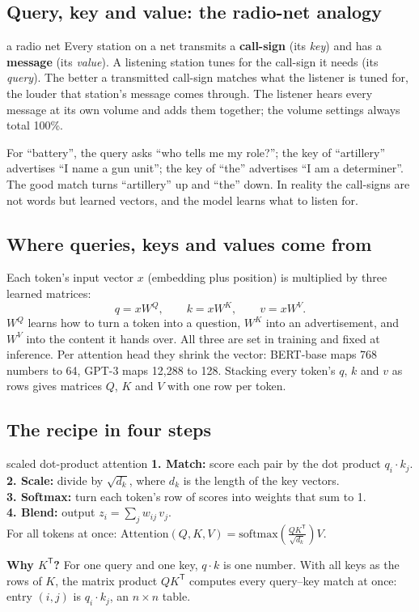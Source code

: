 \documentclass[11pt]{article}
\begin{document}
\subsection{Query, key and value: the radio-net analogy}
\begin{intuition}{a radio net}
Every station on a net transmits a \textbf{call-sign} (its \emph{key}) and has a \textbf{message} (its \emph{value}). A listening station tunes for the call-sign it needs (its \emph{query}). The better a transmitted call-sign matches what the listener is tuned for, the louder that station's message comes through. The listener hears every message at its own volume and adds them together; the volume settings always total 100\%.
\end{intuition}
For ``battery'', the query asks ``who tells me my role?''; the key of ``artillery'' advertises ``I name a gun unit''; the key of ``the'' advertises ``I am a determiner''. The good match turns ``artillery'' up and ``the'' down. In reality the call-signs are not words but learned vectors, and the model learns what to listen for.

\subsection{Where queries, keys and values come from}
Each token's input vector $x$ (embedding plus position) is multiplied by three learned matrices:
\[q=xW^Q,\qquad k=xW^K,\qquad v=xW^V.\]
$W^Q$ learns how to turn a token into a question, $W^K$ into an advertisement, and $W^V$ into the content it hands over. All three are set in training and fixed at inference. Per attention head they shrink the vector: BERT-base maps 768 numbers to 64, GPT-3 maps 12,288 to 128. Stacking every token's $q$, $k$ and $v$ as rows gives matrices $Q$, $K$ and $V$ with one row per token.

\subsection{The recipe in four steps}
\begin{algo}{scaled dot-product attention}
\textbf{1. Match:} score each pair by the dot product $q_i\cdot k_j$.\\
\textbf{2. Scale:} divide by $\sqrt{d_k}$, where $d_k$ is the length of the key vectors.\\
\textbf{3. Softmax:} turn each token's row of scores into weights that sum to 1.\\
\textbf{4. Blend:} output $z_i=\sum_j w_{ij}\,v_j$.\\[3pt]
For all tokens at once: \quad $\displaystyle\text{Attention}(Q,K,V)=\text{softmax}\!\left(\frac{QK^{\mathsf T}}{\sqrt{d_k}}\right)V.$
\end{algo}
\textbf{Why $K^{\mathsf T}$?} For one query and one key, $q\cdot k$ is one number. With all keys as the rows of $K$, the matrix product $QK^{\mathsf T}$ computes every query--key match at once: entry $(i,j)$ is $q_i\cdot k_j$, an $n\times n$ table.
\end{document}
